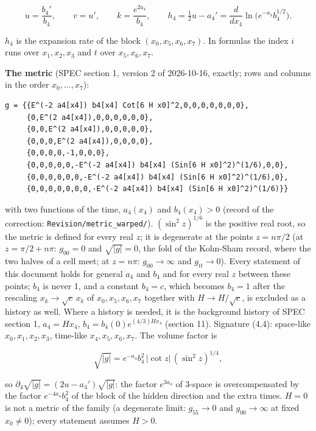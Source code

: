 \documentclass[11pt]{article}
\begin{document}
\[
u = \frac{b_4'}{b_4},\qquad v = u',\qquad k = \frac{e^{2a_4}}{b_4},\qquad h_4 = \tfrac12u - a_4' = \frac{d}{dx_4}\ln\big(e^{-a_4}b_4^{1/2}\big) .
\]

$h_4$ is the expansion rate of the block $(x_0, x_5, x_6, x_7)$. In formulas the index $i$ runs over $x_1, x_2, x_3$ and $t$ over $x_5, x_6, x_7$.

\textbf{The metric} (SPEC section 1, version 2 of 2026-10-16, exactly; rows and columns in the order $x_0, \dots, x_7$):

\begin{Verbatim}[fontsize=\small]
g = {{E^(-2 a4[x4]) b4[x4] Cot[6 H x0]^2,0,0,0,0,0,0,0},
     {0,E^(2 a4[x4]),0,0,0,0,0,0},
     {0,0,E^(2 a4[x4]),0,0,0,0,0},
     {0,0,0,E^(2 a4[x4]),0,0,0,0},
     {0,0,0,0,-1,0,0,0},
     {0,0,0,0,0,-E^(-2 a4[x4]) b4[x4] (Sin[6 H x0]^2)^(1/6),0,0},
     {0,0,0,0,0,0,-E^(-2 a4[x4]) b4[x4] (Sin[6 H x0]^2)^(1/6),0},
     {0,0,0,0,0,0,0,-E^(-2 a4[x4]) b4[x4] (Sin[6 H x0]^2)^(1/6)}}
\end{Verbatim}

with two functions of the time, $a_4(x_4)$ and $b_4(x_4) > 0$ (record of the correction: \texttt{Revision\allowbreak{}/metric\_\allowbreak{}warped/}). $(\sin^2 z)^{1/6}$ is the positive real root, so the metric is defined for every real $z$; it is degenerate at the points $z = n\pi/2$ (at $z = \pi/2 + n\pi$: $g_{00} = 0$ and $\sqrt{|g|} = 0$, the fold of the Kohn-Sham record, where the two halves of a cell meet; at $z = n\pi$: $g_{00} \to \infty$ and $g_{tt} \to 0$). Every statement of this document holds for general $a_4$ and $b_4$ and for every real $z$ between these points; $b_4$ is never 1, and a constant $b_4 = c$, which becomes $b_4 = 1$ after the rescaling $x_k \to \sqrt{c}\,x_k$ of $x_0, x_5, x_6, x_7$ together with $H \to H/\sqrt{c}$, is excluded as a history as well. Where a history is needed, it is the background history of SPEC section 1, $a_4 = Hx_4$, $b_4 = b_4(0)e^{(4/3)Hx_4}$ (section 11). Signature (4,4): space-like $x_0, x_1, x_2, x_3$, time-like $x_4, x_5, x_6, x_7$. The volume factor is

\[
\sqrt{|g|} = e^{-a_4}b_4^2\,|\cot z|\,(\sin^2 z)^{1/4} ,
\]

so $\partial_4\sqrt{|g|} = (2u - a_4')\sqrt{|g|}$: the factor $e^{3a_4}$ of 3-space is overcompensated by the factor $e^{-4a_4}b_4^2$ of the block of the hidden direction and the extra times. $H = 0$ is not a metric of the family (a degenerate limit: $g_{55} \to 0$ and $g_{00} \to \infty$ at fixed $x_0 \neq 0$); every statement assumes $H > 0$.
\end{document}
